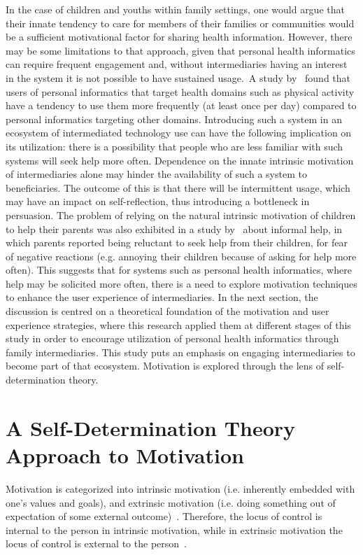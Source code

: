 In the case of children and youths within family settings, one would argue that their innate tendency to care for members of their families or communities would be a sufficient motivational factor for sharing health information. However, there may be some limitations to that approach, given that personal health informatics can require frequent engagement and, without intermediaries having an interest in the system it is not possible to have sustained usage.~A study by~\cite{epstein2015lived} found that users of personal informatics that target health domains such as physical activity have a tendency to use them more frequently (at least once per day) compared to personal informatics targeting other domains. Introducing such a system in an ecosystem of intermediated technology use can have the following implication on its utilization: there is a possibility that people who are less familiar with such systems will seek help more often. Dependence on the innate intrinsic motivation of intermediaries alone may hinder the availability of such a system to beneficiaries. The outcome of this is that there will be intermittent usage, which may have an impact on self-reflection, thus introducing a bottleneck in persuasion. The problem of relying on the natural intrinsic motivation of children to help their parents was also exhibited in a study by~\cite{kiesler:twi} about informal help, in which parents reported being reluctant to seek help from their children, for fear of negative reactions (e.g. annoying their children because of asking for help more often). This suggests that for systems such as personal health informatics, where help may be solicited more often, there is a need to explore motivation techniques to enhance the user experience of intermediaries. In the next section, the discussion is centred on a theoretical foundation of the motivation and user experience strategies, where this research applied  them at different stages of this study in order to encourage utilization of personal health informatics through family intermediaries. This study puts an emphasis on engaging intermediaries to become part of that ecosystem. Motivation is explored through the lens of self-determination theory.
\section{A Self-Determination Theory Approach to Motivation}
Motivation is categorized into intrinsic motivation (i.e. inherently embedded with one's values and goals), and extrinsic motivation (i.e. doing something out of expectation of some external outcome)~\citep{ryan2000intrinsic}. Therefore, the locus of control is internal to the person in intrinsic motivation, while in extrinsic motivation the locus of control is external to the person~\citep{lee2015:relating}.


